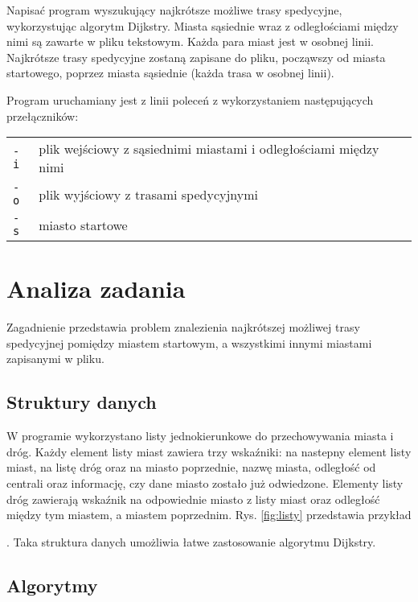 \documentclass[12pt,a4paper,twoside]{article}
\newcommand{\ksremark}[1]{%
   {{\color{brickred}{[#1]}}}%
   \addcontentsline{rks}{uwagas}{\protect{#1}}%
}
\begin{document}
Napisać program wyszukujący najkrótsze możliwe trasy spedycyjne, wykorzystując algorytm Dijkstry. Miasta sąsiednie wraz z odległościami między nimi są zawarte w pliku tekstowym. Każda para miast jest w osobnej linii. Najkrótsze trasy spedycyjne zostaną zapisane do pliku, począwszy od miasta startowego, poprzez miasta sąsiednie (każda trasa w osobnej linii).

Program uruchamiany jest z linii poleceń z wykorzystaniem następujących przełączników:
 
\begin{tabular}{ll}
\texttt{-i}  & plik wejściowy z sąsiednimi miastami i odległościami między nimi\\
\texttt{-o}  & plik wyjściowy z trasami spedycyjnymi\\
\texttt{-s}  & miasto startowe\\
\end{tabular}

\section{Analiza zadania}

Zagadnienie przedstawia problem znalezienia najkrótszej możliwej trasy spedycyjnej pomiędzy miastem startowym, a wszystkimi innymi miastami zapisanymi w pliku.

\subsection{Struktury danych}

W programie wykorzystano listy jednokierunkowe do przechowywania miasta i dróg. Każdy element listy miast zawiera trzy wskaźniki: na nastepny element listy miast, na listę dróg oraz na miasto poprzednie, nazwę miasta, odległość od centrali oraz informację, czy dane miasto zostało już odwiedzone. Elementy listy dróg zawierają wskaźnik na odpowiednie miasto z listy miast oraz odległość między tym miastem, a miastem poprzednim.
Rys. \ref{fig:listy} przedstawia przykład \ksremark{czego?}. 
Taka struktura danych umożliwia łatwe zastosowanie algorytmu Dijkstry.


\subsection{Algorytmy}
\end{document}
